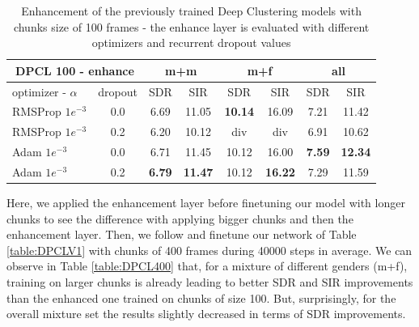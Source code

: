 \documentclass[master, tikz, final,11pt, dvipdfmx]{iscs-thesis}
\begin{document}
\begin{table}[h]
\centering
\begin{tabular}{l|c|c|c|c|c|c|c}
\multicolumn{2}{c|}{DPCL 100 - enhance} & \multicolumn{2}{c|}{m+m} & \multicolumn{2}{c|}{m+f} & \multicolumn{2}{c}{all} \\ 
\hline 
optimizer - $\alpha$ & dropout & SDR & SIR & SDR & SIR & SDR & SIR \\ 
\hline 
RMSProp $1e^{-3}$ & 0.0 & 6.69 & 11.05 & \textbf{10.14} & 16.09 & 7.21 & 11.42 \\ 
RMSProp $1e^{-3}$ & 0.2 & 6.20 & 10.12 & div & div & 6.91 & 10.62 \\ 
Adam $1e^{-3}$ & 0.0 & 6.71 & 11.45 & 10.12 & 16.00 & \textbf{7.59} & \textbf{12.34} \\ 
Adam $1e^{-3}$ & 0.2 &\textbf{6.79}& \textbf{11.47} & 10.12 & \textbf{16.22} & 7.29 & 11.59 \\ 
\end{tabular}
\caption[Enhancement of Deep Clustering trained with 100 frames chunks size]{Enhancement of the previously trained Deep Clustering models with chunks size of 100 frames - the enhance layer is evaluated with different optimizers and recurrent dropout values}
\label{table:DPCL100enh}
\end{table}

Here, we applied the enhancement layer before finetuning our model with longer chunks to see the difference with applying bigger chunks and then the enhancement layer. 
Then, we follow \cite{DPCLV2} and finetune our network of Table \ref{table:DPCLV1} with chunks of 400 frames during 40000 steps in average. We can observe in Table \ref{table:DPCL400} that, for a mixture of different genders (m+f), training on larger chunks is already leading to better SDR and SIR improvements than the enhanced one trained on chunks of size 100. But, surprisingly, for the overall mixture set the results slightly decreased in terms of SDR improvements.
\end{document}
